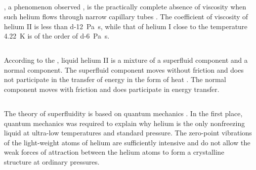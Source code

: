 \subsection{}\label{12.4.3} , a phenomenon observed , is the practically complete absence of viscosity when such helium flows through narrow capillary tubes . The coefficient of viscosity  of helium II is less than \SI{d-12}{\pascal\second}, while that of helium I close to the temperature \SI{4.22}{\kelvin} is of the order of \SI{d-6}{\pascal\second}.

\subsection{}\label{12.4.4} According to the , liquid helium II is a mixture of a superfluid component and a normal component. The superfluid component moves without friction and does not participate in the transfer of energy in the form of heat . The normal component moves with friction and does participate in energy transfer.

\subsection{}\label{12.4.5} The theory of superfluidity is based on quantum mechan­ics . In the first place, quantum mechanics was required to explain why helium is the only nonfreezing liquid at ultra-low temperatures and standard pressure. The zero-point vibra­tions  of the light-weight atoms of helium are sufficient­ly intensive and do not allow the weak forces of attraction between the helium atoms to form a crystalline structure at ordinary pressures.

